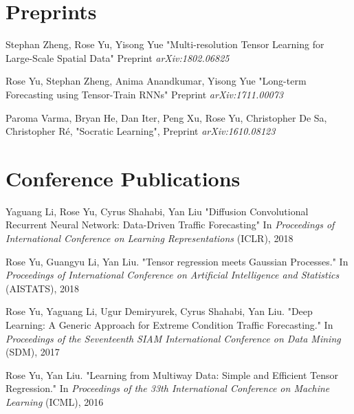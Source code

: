 \documentclass[margin,line]{res}
\begin{document}
\begin{resume}
\section{\sc Preprints}
\begin{enumerate}[label={[P\arabic*]}]
	
\item  Stephan Zheng, Rose Yu, Yisong Yue
	"Multi-resolution Tensor Learning for Large-Scale Spatial Data"
	Preprint \textit{arXiv:1802.06825}
	
\item Rose Yu, Stephan Zheng, Anima Anandkumar, Yisong Yue
"Long-term Forecasting using Tensor-Train RNNs"
Preprint \textit{arXiv:1711.00073}


\item Paroma Varma, Bryan He, Dan Iter, Peng Xu,  Rose Yu, Christopher De Sa,  Christopher R\'e,  "Socratic Learning",
Preprint \textit{arXiv:1610.08123}
\end{enumerate}
\section{\sc Conference Publications}

\begin{enumerate}[label={[C\arabic*]}]
\item 	Yaguang Li,  Rose Yu, Cyrus Shahabi, Yan Liu
	"Diffusion Convolutional Recurrent Neural Network: Data-Driven Traffic Forecasting" In \textit{Proceedings  of  International Conference on Learning Representations
	}(ICLR), 2018 
	
\item  Rose Yu, Guangyu Li, Yan Liu. "Tensor regression meets Gaussian Processes." In \textit{Proceedings  of  International Conference on Artificial Intelligence and Statistics } (AISTATS), 2018 

\item Rose Yu, Yaguang Li, Ugur Demiryurek, Cyrus Shahabi, Yan Liu. "Deep Learning: A Generic Approach for Extreme Condition Traffic Forecasting." In \textit{Proceedings  of the Seventeenth SIAM International Conference on Data Mining }(SDM), 2017

\item Rose Yu, Yan Liu. "Learning from Multiway Data: Simple and Efficient Tensor Regression." In \textit{Proceedings  of the 33th International Conference on Machine Learning }(ICML),   2016


\end{enumerate}
\end{resume}
\end{document}
